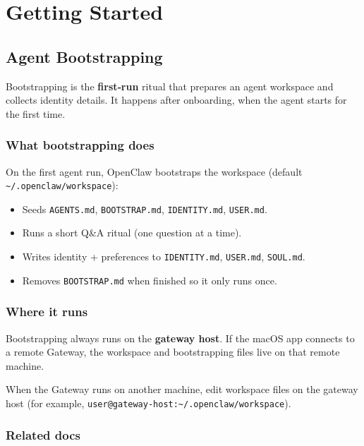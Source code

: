 \chapter{Getting Started}

\section{Agent Bootstrapping}


Bootstrapping is the \textbf{first‑run} ritual that prepares an agent workspace and
collects identity details. It happens after onboarding, when the agent starts
for the first time.

\subsection{What bootstrapping does}


On the first agent run, OpenClaw bootstraps the workspace (default
\texttt{\textasciitilde{}/.openclaw/workspace}):

\begin{itemize}
  \item Seeds \texttt{AGENTS.md}, \texttt{BOOTSTRAP.md}, \texttt{IDENTITY.md}, \texttt{USER.md}.
  \item Runs a short Q\&A ritual (one question at a time).
  \item Writes identity + preferences to \texttt{IDENTITY.md}, \texttt{USER.md}, \texttt{SOUL.md}.
  \item Removes \texttt{BOOTSTRAP.md} when finished so it only runs once.
\end{itemize}


\subsection{Where it runs}


Bootstrapping always runs on the \textbf{gateway host}. If the macOS app connects to
a remote Gateway, the workspace and bootstrapping files live on that remote
machine.

When the Gateway runs on another machine, edit workspace files on the gateway
host (for example, \texttt{user@gateway-host:\textasciitilde{}/.openclaw/workspace}).

\subsection{Related docs}


